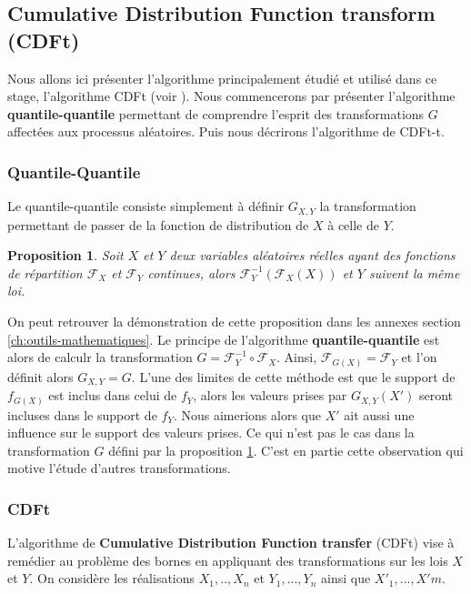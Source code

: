 \documentclass[a4paper,11pt]{article}
\numberwithin{equation}{section}
\newtheorem{proposition}{Proposition}
\begin{document}
\subsection{Cumulative Distribution Function transform (CDFt)}
\label{ch:CDFt}

Nous allons ici présenter l'algorithme principalement étudié et utilisé dans ce stage, l'algorithme CDFt (voir \cite{vrac2012dynamical}). Nous commencerons par présenter l'algorithme \textbf{quantile-quantile} permettant de comprendre l'esprit des transformations $G$ affectées aux processus aléatoires. Puis nous décrirons l'algorithme de CDFt-t. 

\subsubsection{Quantile-Quantile}
\label{Q-Q}
Le quantile-quantile consiste simplement à définir $G_{X,Y}$ la transformation permettant de passer de la fonction de distribution de $X$ à celle de $Y$. 
\begin{proposition}
	\label{prop:QQ_formula}
	Soit $X$ et $Y$ deux variables aléatoires réelles ayant des fonctions de répartition $\mathcal{F}_{X}$ et $\mathcal{F}_{Y}$ continues, alors 
	$\mathcal{F}^{-1}_Y (\mathcal{F}_X(X))$ et $Y$ suivent la même loi. 
\end{proposition}
On peut retrouver la démonstration de cette proposition dans les annexes section \ref{ch:outils-mathematiques}. Le principe de l'algorithme \textbf{quantile-quantile} est alors de calculr la transformation $G=\mathcal{F}^{-1}_{Y} \circ \mathcal{F}_{X}$. Ainsi, $\mathcal{F}_{G(X)}=\mathcal{F}_{Y}$ et l'on définit alors $G_{X,Y}=G$. L'une des limites de cette méthode est que le support de $f_{G(X)}$ est inclus dans celui de $f_{Y}$, alors les valeurs prises par $G_{X,Y}(X')$ seront incluses dans le support de $f_Y$. Nous aimerions alors que $X'$ ait aussi une influence sur le support des valeurs prises. Ce qui n'est pas le cas dans la transformation $G$ défini par la proposition \ref{prop:QQ_formula}. C'est en partie cette observation qui motive l'étude d'autres transformations. 

\subsubsection{CDFt}
\label{CDf-t-algo}

L'algorithme de \textbf{Cumulative Distribution Function transfer} (CDFt) vise à remédier au problème des bornes en appliquant des transformations sur les lois $X$ et $Y$. On considère les réalisations $X_1,..,X_n$ et $Y_1,...,Y_n$ ainsi que $X'_{1},...,X'{m}$.
\end{document}
